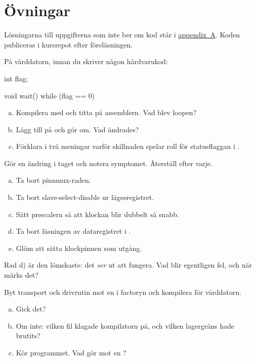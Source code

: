 \section*{Övningar}

Lösningarna till uppgifterna som inte ber om kod står i \hyperref[ch:losningar]{appendix~A}.
Koden publiceras i kursrepot efter föreläsningen.

\label{ex:12:1}
På värddatorn, innan du skriver någon hårdvarukod:
\begin{cppcode}
int flag{};

void wait()
{
    while (flag == 0)
    {
    }
}
\end{cppcode}
\begin{enumerate}[a)]
  \item Kompilera med  och titta på assemblern. Vad blev loopen?
  \item Lägg till  på  och gör om. Vad ändrades?
  \item Förklara i två meningar varför skillnaden spelar roll för statusflaggan i
    .
\end{enumerate}

\label{ex:12:2}
Gör en ändring i taget och notera symptomet. Återställ efter varje.
\begin{enumerate}[a)]
  \item Ta bort pinnmux-raden.
  \item Ta bort slave-select-disable ur lägesregistret.
  \item Sätt prescalern så att klockan blir dubbelt så snabb.
  \item Ta bort läsningen av dataregistret i .
  \item Glöm att sätta klockpinnen som utgång.
\end{enumerate}
Rad d) är den lömskaste: det \emph{ser} ut att fungera. Vad blir egentligen fel, och när märks det?

\label{ex:12:3}
Byt transport och drivrutin mot en  i factoryn och kompilera för värddatorn.
\begin{enumerate}[a)]
  \item Gick det?
  \item Om inte: vilken fil klagade kompilatorn på, och vilken lagergräns hade brutits?
  \item Kör programmet. Vad gör  mot en ?
\end{enumerate}

